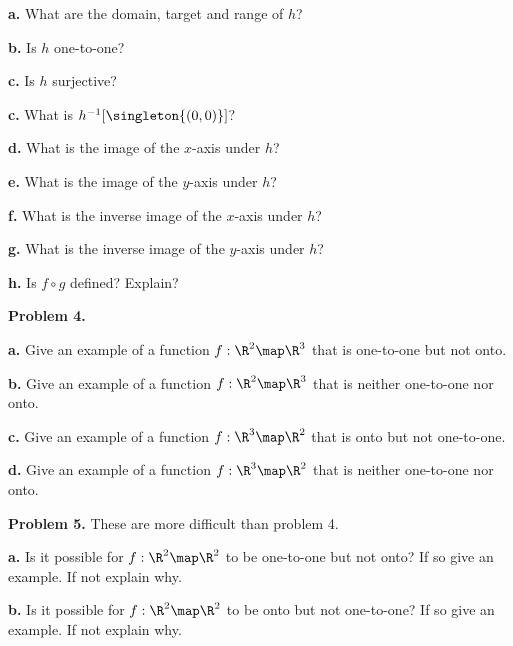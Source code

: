 \documentclass[oneside,12pt]{amsart}
\begin{document}
\smallskip

\textbf{a.}  What are the domain, target and range of $h$?

\medskip

\textbf{b.} Is $h$ one-to-one?

\medskip

\textbf{c.} Is $h$ surjective?

\medskip

\textbf{c.} What is $h^{-1}[\singleton{(0,0)}]$?

\medskip

\textbf{d.} What is the image of the $x$-axis under $h$?

\medskip

\textbf{e.} What is the image of the $y$-axis under $h$?

\medskip

\textbf{f.} What is the inverse image of the $x$-axis under $h$?

\medskip

\textbf{g.} What is the inverse image of the $y$-axis under $h$?

\medskip

\textbf{h.} Is $f \circ g$ defined? Explain?

\bigskip

\textbf{Problem 4.}
\smallskip

\textbf{a.} Give an example of a function $f:\R^2\map\R^3$ that is
one-to-one but not onto.

\bigskip

\textbf{b.} Give an example of a function $f:\R^2\map\R^3$ that is neither
one-to-one nor onto.

\bigskip

\textbf{c.} Give an example of a function $f:\R^3\map\R^2$ that is
onto but not one-to-one.

\bigskip

\textbf{d.} Give an example of a function $f:\R^3\map\R^2$ that is neither
one-to-one nor onto.


\bigskip

\textbf{Problem 5.} These are more difficult than problem 4.
\smallskip

\textbf{a.} Is it possible for $f:\R^2\map\R^2$ to be one-to-one but not onto?
If so give an example. If not explain why.

\bigskip

\textbf{b.} Is it possible for $f:\R^2\map\R^2$ to be onto but not one-to-one?
If so give an example. If not explain why.
\end{document}
